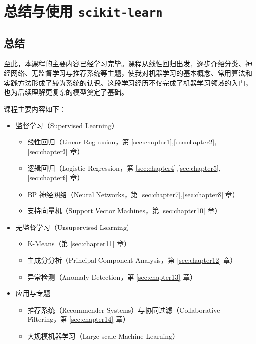 \section{总结与使用 \texttt{scikit-learn}}
\label{sec:chapter15}

\subsection{总结}

至此，本课程的主要内容已经学习完毕。课程从线性回归出发，逐步介绍分类、神经网络、无监督学习与推荐系统等主题，使我对机器学习的基本概念、常用算法和实践方法形成了较为系统的认识。这段学习经历不仅完成了机器学习领域的入门，也为后续理解更复杂的模型奠定了基础。

课程主要内容如下：

\begin{itemize}
    \item 监督学习（Supervised Learning）
      \begin{itemize}
        \item 线性回归（Linear Regression，第 \ref{sec:chapter1},\ref{sec:chapter2},\ref{sec:chapter3} 章）
        \item 逻辑回归（Logistic Regression，第 \ref{sec:chapter4},\ref{sec:chapter5},\ref{sec:chapter6} 章）
        \item BP 神经网络（Neural Networks，第 \ref{sec:chapter7},\ref{sec:chapter8} 章）
        \item 支持向量机（Support Vector Machines，第 \ref{sec:chapter10} 章）
      \end{itemize}
    \item 无监督学习（Unsupervised Learning）
      \begin{itemize}
        \item K-Means（第 \ref{sec:chapter11} 章）
        \item 主成分分析（Principal Component Analysis，第 \ref{sec:chapter12} 章）
        \item 异常检测（Anomaly Detection，第 \ref{sec:chapter13} 章）
      \end{itemize}
    \item 应用与专题
      \begin{itemize}
        \item 推荐系统（Recommender Systems）与协同过滤（Collaborative Filtering，第 \ref{sec:chapter14} 章）
        \item 大规模机器学习（Large-scale Machine Learning）
      \end{itemize}

\end{itemize}
